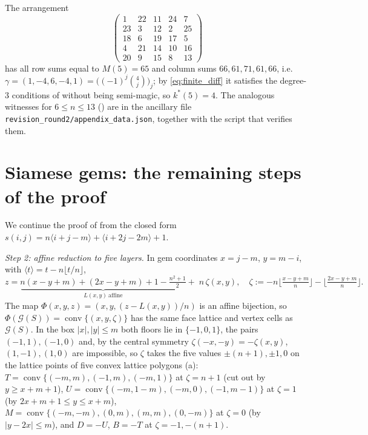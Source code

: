 The arrangement
\[
\begin{pmatrix}1&22&11&24&7\\23&3&12&2&25\\18&6&19&17&5\\4&21&14&10&16\\20&9&15&8&13\end{pmatrix}
\]
has all row sums equal to $M(5)=65$ and column sums $66,61,71,61,66$, i.e.\ $\gamma=(1,-4,6,-4,1)=\bigl((-1)^j\binom4j\bigr)_j$;
by \eqref{eq:finite_diff} it satisfies the degree-$3$ conditions of  without being semi-magic, so
$k^*(5)=4$.  The analogous witnesses for $6\le n\le13$ () are in the ancillary file
\texttt{revision\_round2/appendix\_data.json}, together with the script that verifies them.

\section{Siamese gems: the remaining steps of the proof}
\label{sec:app_siamese}

We continue the proof of  from the closed form $s(i,j)=n\langle i+j-m\rangle+\langle i+2j-2m\rangle+1$.

\emph{Step 2: affine reduction to five layers.}  In gem coordinates $x=j-m$, $y=m-i$, with $\langle t\rangle=t-n\lfloor t/n\rfloor$,
\[
z=\underbrace{n(x-y+m)+(2x-y+m)+1-\tfrac{n^2+1}{2}}_{L(x,y)\ \text{affine}}+\;n\,\zeta(x,y),\quad
\zeta:=-n\Big\lfloor\tfrac{x-y+m}{n}\Big\rfloor-\Big\lfloor\tfrac{2x-y+m}{n}\Big\rfloor .
\]
The map $\Phi(x,y,z)=(x,y,(z-L(x,y))/n)$ is an affine bijection, so $\Phi(\mathcal G(S))=\operatorname{conv}\{(x,y,\zeta)\}$ has the
same face lattice and vertex cells as $\mathcal G(S)$.  In the box $|x|,|y|\le m$ both floors lie in $\{-1,0,1\}$, the pairs
$(-1,1),(-1,0)$ and, by the central symmetry $\zeta(-x,-y)=-\zeta(x,y)$, $(1,-1),(1,0)$ are impossible, so $\zeta$ takes the
five values $\pm(n+1),\pm1,0$ on the lattice points of five convex lattice polygons (a):
$T=\operatorname{conv}\{(-m,m),(-1,m),(-m,1)\}$ at $\zeta=n+1$ (cut out by $y\ge x+m+1$),
$U=\operatorname{conv}\{(-m,1-m),(-m,0),(-1,m-1)\}$ at $\zeta=1$ (by $2x+m+1\le y\le x+m$),
$M=\operatorname{conv}\{(-m,-m),(0,m),(m,m),(0,-m)\}$ at $\zeta=0$ (by $|y-2x|\le m$), and $D=-U$, $B=-T$ at $\zeta=-1,-(n+1)$.

